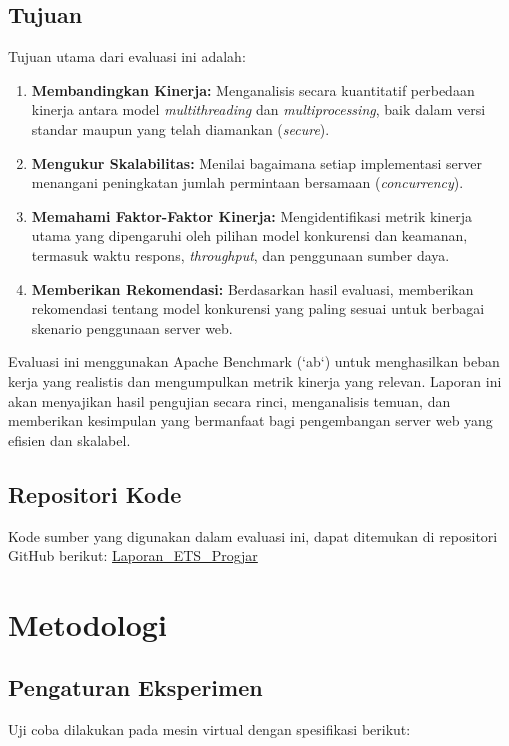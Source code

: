 \documentclass[12pt]{article}
\begin{document}
\subsection{Tujuan}

Tujuan utama dari evaluasi ini adalah:

\begin{enumerate}
    \item \textbf{Membandingkan Kinerja:} Menganalisis secara kuantitatif perbedaan kinerja antara model \textit{multithreading} dan \textit{multiprocessing}, baik dalam versi standar maupun yang telah diamankan (\textit{secure}).
    \item \textbf{Mengukur Skalabilitas:} Menilai bagaimana setiap implementasi server menangani peningkatan jumlah permintaan bersamaan (\textit{concurrency}).
    \item \textbf{Memahami Faktor-Faktor Kinerja:} Mengidentifikasi metrik kinerja utama yang dipengaruhi oleh pilihan model konkurensi dan keamanan, termasuk waktu respons, \textit{throughput}, dan penggunaan sumber daya.
    \item \textbf{Memberikan Rekomendasi:} Berdasarkan hasil evaluasi, memberikan rekomendasi tentang model konkurensi yang paling sesuai untuk berbagai skenario penggunaan server web.
\end{enumerate}

Evaluasi ini menggunakan Apache Benchmark (`ab`) untuk menghasilkan beban kerja yang realistis dan mengumpulkan metrik kinerja yang relevan. Laporan ini akan menyajikan hasil pengujian secara rinci, menganalisis temuan, dan memberikan kesimpulan yang bermanfaat bagi pengembangan server web yang efisien dan skalabel.

\subsection{Repositori Kode}

Kode sumber yang digunakan dalam evaluasi ini, dapat ditemukan di repositori GitHub berikut:
\href{https://github.com/daf2a/Laporan_ETS_Progjar}{Laporan\_ETS\_Progjar}

\newpage

\section{Metodologi}
\subsection{Pengaturan Eksperimen}
Uji coba dilakukan pada mesin virtual dengan spesifikasi berikut:
\end{document}

